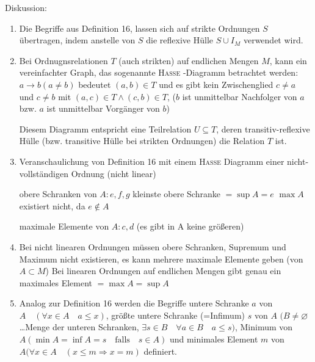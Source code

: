 \documentclass[a4paper]{scrartcl}
\begin{document}
Diskussion:
\begin{enumerate}
\item Die Begriffe aus Definition 16, lassen sich auf strikte Ordnungen $S$ übertragen, indem anstelle von $S$ die reflexive Hülle $S \cup I_M$ verwendet wird.
\item Bei Ordnugnsrelationen $T$ (auch strikten) auf endlichen Mengen $M$, kann ein vereinfachter Graph, das sogenannte \textsc{Hasse} -Diagramm betrachtet werden:
$a \rightarrow b (a\neq b)$ bedeutet $(a,b) \in T$ und es gibt kein Zwischenglied $c \neq a$ und $c \neq b$ mit $(a,c) \in T \wedge (c,b) \in T$, ($b$ ist unmittelbar Nachfolger von $a$ bzw. $a$ ist unmittelbar Vorgänger von $b$)

Diesem Diagramm entspricht eine Teilrelation $U \subseteq T$, deren transitiv-reflexive Hülle (bzw. transitive Hülle bei strikten Ordnungen) die Relation $T$ ist.
\item Veranschaulichung von Definition 16 mit einem \textsc{Hasse} Diagramm einer nicht-vollständigen Ordnung (nicht linear)


obere Schranken von $A : e,f,g$
kleinste obere Schranke $= \sup{A} = e$
$\max{A}$ existiert nicht, da $e \notin A$

maximale Elemente von $A: c,d$ (es gibt in A keine größeren)
\item Bei nicht linearen Ordnungen müssen obere Schranken, Supremum und Maximum nicht existieren, es kann mehrere maximale Elemente geben (von $A \subset M$) Bei linearen Ordnungen auf endlichen Mengen gibt genau ein maximales Element $= \max{A} = \sup{A}$

\item Analog zur Definition 16 werden die Begriffe untere Schranke $a$ von $A \quad (\forall x \in A \quad a\leq x)$, größte untere Schranke (=Infimum) $s$ von $A$ $(B \neq \varnothing$ \dots Menge der unteren Schranken, $\exists s \in B \quad \forall a \in B \quad a \leq s)$, Minimum von $A (\min{A} = \inf{A}=s \quad \text{falls} \quad  s \in A)$ und minimales Element $m$ von $A (\forall x \in A \quad ( x \leq m \Rightarrow x=m)$ definiert.
\end{enumerate}
\end{document}
